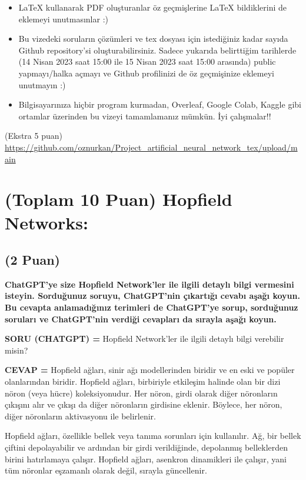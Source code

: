 \documentclass[11pt]{article}
\begin{document}
\begin{itemize}
    \item LaTeX kullanarak PDF oluşturanlar öz geçmişlerine LaTeX bildiklerini de eklemeyi unutmasınlar :)
    \item Bu vizedeki soruların çözümleri ve tex dosyası için istediğiniz kadar sayıda Github repository'si oluşturabilirsiniz. Sadece yukarıda belirttiğim tarihlerde (14 Nisan 2023 saat 15:00 ile 15 Nisan 2023 saat 15:00 arasında) public yapmayı/halka açmayı ve Github profilinizi de öz geçmişinize eklemeyi unutmayın :)
    \item Bilgisayarınıza hiçbir program kurmadan, Overleaf, Google Colab, Kaggle gibi ortamlar üzerinden bu vizeyi tamamlamanız mümkün. İyi çalışmalar!!
\end{itemize}

(Ekstra 5 puan) \url{https://github.com/oznurkan/Project_artificial_neural_network_tex/upload/main}

\newpage
\section{(Toplam 10 Puan) Hopfield Networks:}

\subsection{(2 Puan)} \textbf{ChatGPT’ye size Hopfield Network’ler ile ilgili detaylı bilgi vermesini isteyin. Sorduğunuz soruyu, ChatGPT'nin çıkartığı cevabı aşağı koyun. Bu cevapta anlamadığınız terimleri de ChatGPT’ye sorup, sorduğunuz soruları ve ChatGPT’nin verdiği cevapları da sırayla aşağı koyun.}

\textbf{SORU (CHATGPT) =} Hopfield Network’ler ile ilgili detaylı bilgi verebilir misin?

\textbf{CEVAP =} Hopfield ağları, sinir ağı modellerinden biridir ve en eski ve popüler olanlarından biridir. Hopfield ağları, birbiriyle etkileşim halinde olan bir dizi nöron (veya hücre) koleksiyonudur. Her nöron, girdi olarak diğer nöronların çıkışını alır ve çıkışı da diğer nöronların girdisine eklenir. Böylece, her nöron, diğer nöronların aktivasyonu ile belirlenir.

Hopfield ağları, özellikle bellek veya tanıma sorunları için kullanılır. Ağ, bir bellek çiftini depolayabilir ve ardından bir girdi verildiğinde, depolanmış belleklerden birini hatırlamaya çalışır. Hopfield ağları, asenkron dinamikleri ile çalışır, yani tüm nöronlar eşzamanlı olarak değil, sırayla güncellenir.
\end{document}
